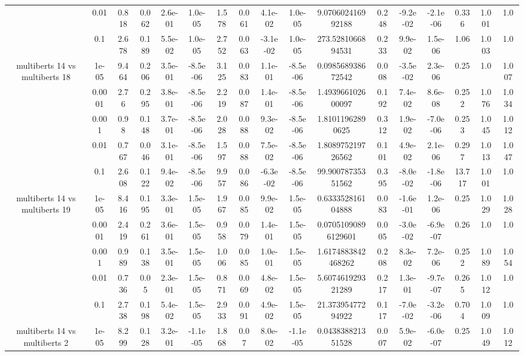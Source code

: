 \begin{tabular}{|c|c|c|c|c|c|c|c|c|c|c|c|c|c|c|c|c|}
 & 0.01 & 0.818 & 0.062 & 2.6e-01 & 1.0e-05 & 1.578 & 0.061 & 4.1e-02 & 1.0e-05 & 9.070602416992188 & 0.248 & -9.2e-02 & -2.1e-06 & 0.336 & 1.001 & 1.0 \\
 & 0.1 & 2.678 & 0.189 & 5.5e-02 & 1.0e-05 & 2.752 & 0.063 & -3.1e-02 & 1.0e-05 & 273.5281066894531 & 0.233 & 9.9e-02 & 1.5e-06 & 1.06 & 1.003 & 1.0 \\
\hline
\multirow{5}{*}{multiberts 14 vs multiberts 18} & 1e-05 & 9.464 & 0.206 & 3.5e-01 & -8.5e-06 & 3.125 & 0.083 & 1.1e-01 & -8.5e-06 & 0.098568938672542 & 0.008 & -3.5e-02 & 2.3e-06 & 0.25 & 1.0 & 1.007 \\
 & 0.0001 & 2.76 & 0.295 & 3.8e-01 & -8.5e-06 & 2.219 & 0.087 & 1.4e-01 & -8.5e-06 & 1.493966102600097 & 0.192 & 7.4e-02 & 8.6e-08 & 0.252 & 1.076 & 1.034 \\
 & 0.001 & 0.98 & 0.148 & 3.7e-01 & -8.5e-06 & 2.028 & 0.088 & 9.3e-02 & -8.5e-06 & 1.81011962890625 & 0.312 & 1.9e-02 & -7.0e-06 & 0.253 & 1.045 & 1.012 \\
 & 0.01 & 0.767 & 0.046 & 3.1e-01 & -8.5e-06 & 1.597 & 0.088 & 7.5e-02 & -8.5e-06 & 1.808975219726562 & 0.101 & 4.9e-02 & 2.1e-06 & 0.297 & 1.013 & 1.047 \\
 & 0.1 & 2.608 & 0.122 & 9.4e-02 & -8.5e-06 & 9.957 & 0.086 & -6.3e-02 & -8.5e-06 & 99.90078735351562 & 0.395 & -8.0e-02 & -1.8e-06 & 13.717 & 1.001 & 1.0 \\
\hline
\multirow{5}{*}{multiberts 14 vs multiberts 19} & 1e-05 & 8.416 & 0.195 & 3.3e-01 & 1.5e-05 & 1.967 & 0.085 & 9.9e-02 & 1.5e-05 & 0.633352816104888 & 0.083 & -1.6e-01 & 1.2e-06 & 0.25 & 1.029 & 1.028 \\
 & 0.0001 & 2.419 & 0.261 & 3.6e-01 & 1.5e-05 & 0.958 & 0.079 & 1.4e-01 & 1.5e-05 & 0.07051090896129601 & 0.005 & -3.0e-02 & -6.9e-07 & 0.26 & 1.0 & 1.0 \\
 & 0.001 & 0.989 & 0.138 & 3.5e-01 & 1.5e-05 & 1.006 & 0.085 & 1.0e-01 & 1.5e-05 & 1.6174883842468262 & 0.208 & 8.3e-02 & 7.2e-06 & 0.252 & 1.089 & 1.054 \\
 & 0.01 & 0.736 & 0.05 & 2.3e-01 & 1.5e-05 & 0.871 & 0.069 & 4.8e-02 & 1.5e-05 & 5.607461929321289 & 0.217 & 1.3e-01 & -9.7e-07 & 0.265 & 1.012 & 1.0 \\
 & 0.1 & 2.738 & 0.198 & 5.4e-02 & 1.5e-05 & 2.933 & 0.091 & 4.9e-02 & 1.5e-05 & 21.37395477294922 & 0.117 & -7.0e-02 & -3.2e-06 & 0.704 & 1.009 & 1.0 \\
\hline
\multirow{5}{*}{multiberts 14 vs multiberts 2} & 1e-05 & 8.299 & 0.128 & 3.2e-01 & -1.1e-05 & 1.868 & 0.07 & 8.0e-02 & -1.1e-05 & 0.043838821351528 & 0.007 & 5.9e-02 & -6.0e-07 & 0.25 & 1.049 & 1.012 \\

\end{tabular}
